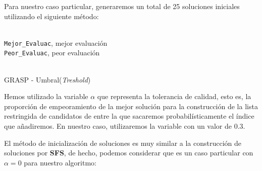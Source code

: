 \documentclass[a4paper, 11pt]{article}
\begin{document}
			Para nuestro caso particular, generaremos un total de 25 soluciones iniciales utilizando
			el siguiente método:
			
			\begin{algorithm}[H]
				\begin{algorithmic}[1]
					\REQUIRE \ \\
						\texttt{Mejor\_Evaluac}, mejor evaluación \\
						\texttt{Peor\_Evaluac}, peor evaluación \\ \
						
				\end{algorithmic}
			\caption{GRASP - Umbral(\textit{Treshold})}
			\label{Treshold}
			\end{algorithm}
			
			Hemos utilizado la variable $\alpha$ que representa la tolerancia de calidad, esto es, la
			proporción de empeoramiento de la mejor solución para la construcción de la lista restringida
			de candidatos de entre la que sacaremos probabilísticamente el índice que añadiremos. En
			nuestro caso, utilizaremos la variable con un valor de $0.3$.
			
			El método de inicialización de soluciones es muy similar a la construcción de soluciones por
			\textbf{SFS}, de hecho, podemos considerar que es un caso particular con $\alpha = 0$ para
			nuestro algoritmo:
			
\end{document}
